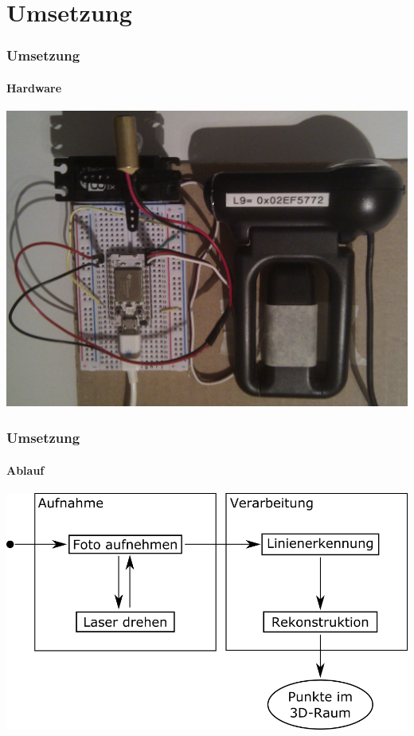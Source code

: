 \documentclass[xcolor=dvipsnames]{beamer}
\begin{document}

\section{Umsetzung} 
\begin{frame}
	\frametitle{Umsetzung}
	\framesubtitle{Hardware}

	\includegraphics[width=0.9\linewidth]{includes/hardware.jpg}

\end{frame}


\begin{frame}
	\frametitle{Umsetzung}
	\framesubtitle{Ablauf}

	\includegraphics[width=\linewidth]{includes/blockbild.png}

\end{frame}
\end{document}
